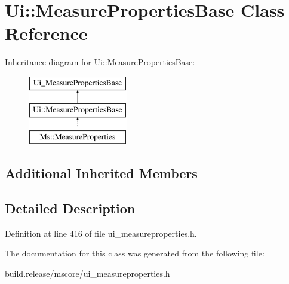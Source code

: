 \hypertarget{class_ui_1_1_measure_properties_base}{}\section{Ui\+:\+:Measure\+Properties\+Base Class Reference}
\label{class_ui_1_1_measure_properties_base}
Inheritance diagram for Ui\+:\+:Measure\+Properties\+Base\+:\begin{figure}[H]
\begin{center}
\leavevmode
\includegraphics[height=3.000000cm]{class_ui_1_1_measure_properties_base}
\end{center}
\end{figure}
\subsection*{Additional Inherited Members}


\subsection{Detailed Description}


Definition at line 416 of file ui\+\_\+measureproperties.\+h.



The documentation for this class was generated from the following file\+:\begin{DoxyCompactItemize}
\item 
build.\+release/mscore/ui\+\_\+measureproperties.\+h\end{DoxyCompactItemize}
